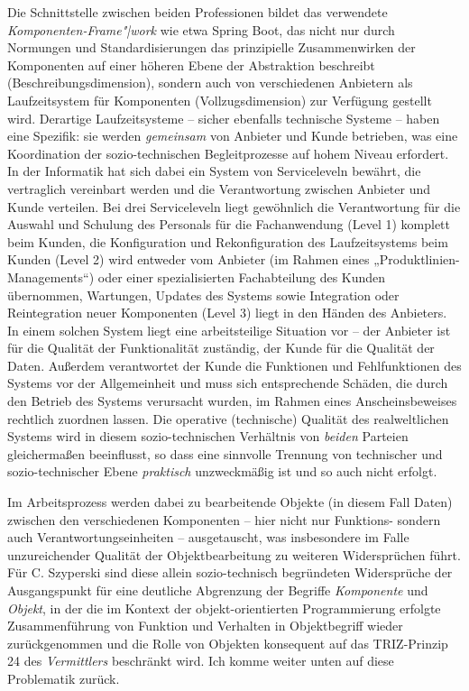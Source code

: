 \documentclass[12pt,a4paper]{article}
\begin{document}
Die Schnittstelle zwischen beiden Professionen bildet das verwendete
\emph{Komponenten-Frame"|work} wie etwa Spring Boot, das nicht nur durch
Normungen und Standardisierungen das prinzipielle Zusammenwirken der
Komponenten auf einer höheren Ebene der Abstraktion beschreibt
(Beschreibungsdimension), sondern auch von verschiedenen Anbietern als
Laufzeitsystem für Komponenten (Vollzugsdimension) zur Verfügung gestellt
wird. Derartige Laufzeitsysteme -- sicher ebenfalls technische Systeme --
haben eine Spezifik: sie werden \emph{gemeinsam} von Anbieter und Kunde
betrieben, was eine Koordination der sozio-technischen Begleitprozesse auf
hohem Niveau erfordert. In der Informatik hat sich dabei ein System von
Serviceleveln bewährt, die vertraglich vereinbart werden und die Verantwortung
zwischen Anbieter und Kunde verteilen. Bei drei Serviceleveln liegt gewöhnlich
die Verantwortung für die Auswahl und Schulung des Personals für die
Fachanwendung (Level 1) komplett beim Kunden, die Konfiguration und
Rekonfiguration des Laufzeitsystems beim Kunden (Level 2) wird entweder vom
Anbieter (im Rahmen eines „Produktlinien-Managements“) oder einer
spezialisierten Fachabteilung des Kunden übernommen, Wartungen, Updates des
Systems sowie Integration oder Reintegration neuer Komponenten (Level 3) liegt
in den Händen des Anbieters. In einem solchen System liegt eine arbeitsteilige
Situation vor -- der Anbieter ist für die Qualität der Funktionalität
zuständig, der Kunde für die Qualität der Daten. Außerdem verantwortet der
Kunde die Funktionen und Fehlfunktionen des Systems vor der Allgemeinheit und
muss sich entsprechende Schäden, die durch den Betrieb des Systems verursacht
wurden, im Rahmen eines Anscheinsbeweises rechtlich zuordnen lassen.  Die
operative (technische) Qualität des realweltlichen Systems wird in diesem
sozio-technischen Verhältnis von \emph{beiden} Parteien gleichermaßen
beeinflusst, so dass eine sinnvolle Trennung von technischer und
sozio-technischer Ebene \emph{praktisch} unzweckmäßig ist und so auch nicht
erfolgt.

Im Arbeitsprozess werden dabei zu bearbeitende Objekte (in diesem Fall Daten)
zwischen den verschiedenen Komponenten -- hier nicht nur Funktions- sondern
auch Verantwortungseinheiten -- ausgetauscht, was insbesondere im Falle
unzureichender Qualität der Objektbearbeitung zu weiteren Widersprüchen führt.
Für C. Szyperski \cite{Szyperski2002} sind diese allein sozio-technisch
begründeten Widersprüche der Ausgangspunkt für eine deutliche Abgrenzung der
Begriffe \emph{Komponente} und \emph{Objekt}, in der die im Kontext der
objekt-orientierten Programmierung erfolgte Zusammenführung von Funktion und
Verhalten in Objektbegriff wieder zurückgenommen und die Rolle von Objekten
konsequent auf das TRIZ-Prinzip 24 des \emph{Vermittlers} beschränkt wird.
Ich komme weiter unten auf diese Problematik zurück.
\end{document}

